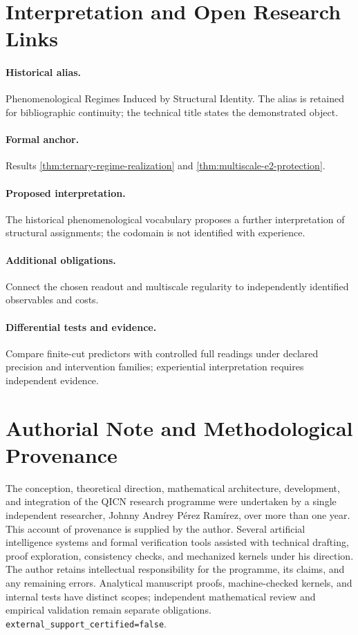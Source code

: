 \documentclass[11pt,a4paper]{article}
\theoremstyle{plain}
\theoremstyle{definition}
\theoremstyle{remark}
\begin{document}
\section{Interpretation and Open Research Links}\label{sec:interpretation-open-links}
\paragraph{Historical alias.} Phenomenological Regimes Induced by Structural Identity. The alias is retained for bibliographic continuity; the technical title states the demonstrated object.

\paragraph{Formal anchor.} Results \ref{thm:ternary-regime-realization} and \ref{thm:multiscale-e2-protection}.

\paragraph{Proposed interpretation.} The historical phenomenological vocabulary proposes a further interpretation of structural assignments; the codomain is not identified with experience.

\paragraph{Additional obligations.} Connect the chosen readout and multiscale regularity to independently identified observables and costs.

\paragraph{Differential tests and evidence.} Compare finite-cut predictors with controlled full readings under declared precision and intervention families; experiential interpretation requires independent evidence.



\printbibliography
\section*{Authorial Note and Methodological Provenance}
The conception, theoretical direction, mathematical architecture, development,
and integration of the QICN research programme were undertaken by a single
independent researcher, Johnny Andrey P\'erez Ram\'irez, over more than one year.
This account of provenance is supplied by the author. Several artificial
intelligence systems and formal verification tools assisted with technical
drafting, proof exploration, consistency checks, and mechanized kernels under
his direction. The author retains intellectual responsibility for the
programme, its claims, and any remaining errors. Analytical manuscript proofs,
machine-checked kernels, and internal tests have distinct scopes; independent
mathematical review and empirical validation remain separate obligations.
\texttt{external\_support\_certified=false}.
\end{document}
